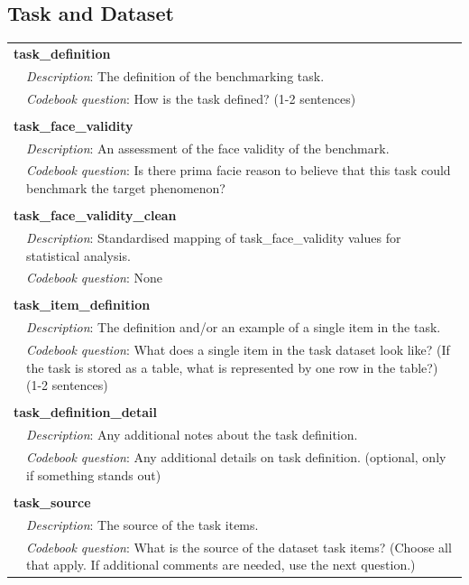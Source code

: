 \subsection{\textcolor{task}{Task} and Dataset}
{\small\begin{longtable}{p{}p{}}
\multicolumn{2}{l}{\textbf{task\_definition}} \\
& \textit{Description}: The definition of the benchmarking task. \\
& \textit{Codebook question}: How is the task defined? (1-2 sentences) \\
\\
\multicolumn{2}{l}{\textbf{task\_face\_validity}} \\
& \textit{Description}: An assessment of the face validity of the benchmark. \\
& \textit{Codebook question}: Is there prima facie reason to believe that this task could benchmark the target phenomenon? \\
\\
\multicolumn{2}{l}{\textbf{task\_face\_validity\_clean}} \\
& \textit{Description}: Standardised mapping of task\_face\_validity values for statistical analysis. \\
& \textit{Codebook question}: None \\
\\
\multicolumn{2}{l}{\textbf{task\_item\_definition}} \\
& \textit{Description}: The definition and/or an example of a single item in the task. \\
& \textit{Codebook question}: What does a single item in the task dataset look like? (If the task is stored as a table, what is represented by one row in the table?) (1-2 sentences) \\
\\
\multicolumn{2}{l}{\textbf{task\_definition\_detail}} \\
& \textit{Description}: Any additional notes about the task definition. \\
& \textit{Codebook question}: Any additional details on task definition. (optional, only if something stands out) \\
\\
\multicolumn{2}{l}{\textbf{task\_source}} \\
& \textit{Description}: The source of the task items. \\
& \textit{Codebook question}: What is the source of the dataset task items? (Choose all that apply. If additional comments are needed, use the next question.) \\

\end{longtable}}
